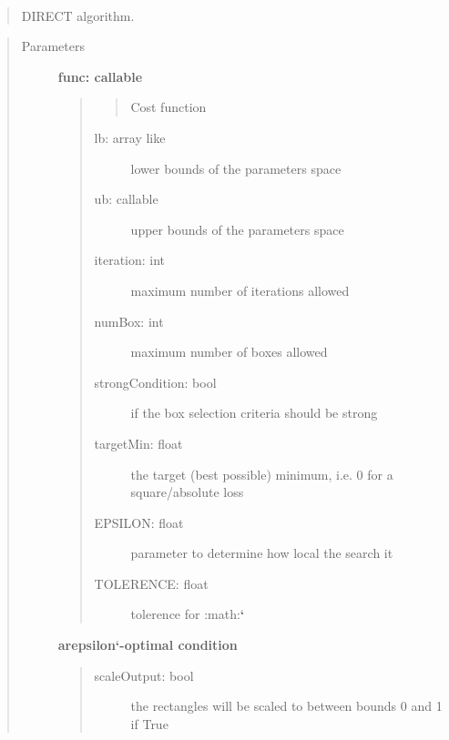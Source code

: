 \documentclass[letterpaper,10pt,english]{sphinxmanual}
\begin{document}
\begin{fulllineitems}
~\begin{quote}

DIRECT algorithm.
\end{quote}
\begin{quote}\begin{description}
\item[{Parameters}] \leavevmode
\textbf{func: callable}
\begin{quote}
\begin{quote}

Cost function
\end{quote}
\begin{description}
\item[{lb: array like}] \leavevmode
lower bounds of the parameters space

\item[{ub: callable}] \leavevmode
upper bounds of the parameters space

\item[{iteration: int}] \leavevmode
maximum number of iterations allowed

\item[{numBox: int}] \leavevmode
maximum number of boxes allowed

\item[{strongCondition: bool}] \leavevmode
if the box selection criteria should be strong

\item[{targetMin: float}] \leavevmode
the target (best possible) minimum, i.e. 0 for
a square/absolute loss

\item[{EPSILON: float}] \leavevmode
parameter to determine how local the search it

\item[{TOLERENCE: float}] \leavevmode
tolerence for :math:{\color{red}\bfseries{}{}`}

\end{description}
\end{quote}

\textbf{arepsilon{}`-optimal condition}
\begin{quote}
\begin{description}
\item[{scaleOutput: bool}] \leavevmode
the rectangles will be scaled to between bounds
0 and 1 if True


\end{description}
\end{quote}
\end{description}
\end{quote}
\end{fulllineitems}
\end{document}
